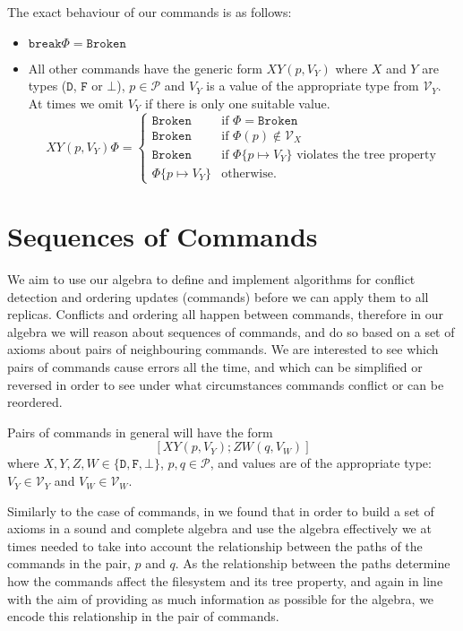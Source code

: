 \documentclass[12pt]{article}
\newcommand{\setvx}[1]{\mathcal{V}_{#1}}
\newcommand{\setp}{\mathcal{P}}
\newcommand{\empt}{\bot}
\newcommand{\fsbroken}{\mathtt{Broken}} %
\newcommand{\FS}{\Phi} %
\newcommand{\cbrk}{\mathtt{break}}
\newcommand{\fscommand}[2]{{#1#2}}
\newcommand{\fsregcommandchar}[1]{\mathtt{#1}}
\newcommand{\cxy}{\fscommand{X}{Y}}
\newcommand{\czw}{\fscommand{Z}{W}}
\theoremstyle{definition}
\begin{document}
The exact behaviour of our commands is as follows:
\begin{itemize}
\item $\cbrk\FS = \fsbroken$
\item
All other commands have the generic form $\cxy(p,V_Y)$ where
$X$ and $Y$ are types ($\fsregcommandchar{D}$, $\fsregcommandchar{F}$ or $\fsregcommandchar{\empt}$),
$p\in\setp$ and $V_Y$ is a value of the appropriate type from $\setvx{Y}$.
At times we omit $V_Y$ if there is only one suitable value.
\[ \cxy(p,V_Y)\FS = 
   \begin{cases}
   \fsbroken &\mbox{if~} \FS=\fsbroken\\
   \fsbroken &\mbox{if~} \FS(p)\not\in\setvx{X}\\
   \fsbroken &\mbox{if~} \FS\{p\mapsto V_Y\} \mbox{~violates the tree property}\\
   \FS\{p\mapsto V_Y\} &\mbox{otherwise.}
   \end{cases}
\]
\end{itemize}

\section{Sequences of Commands}



We aim to use our algebra to define and implement algorithms for conflict detection
and ordering updates (commands) before we can apply them to all replicas.
Conflicts and ordering all happen between commands, therefore in our algebra
we will reason about sequences of commands, 
and do so based on a set of axioms about pairs of neighbouring commands.
We are interested to see which pairs of commands cause errors all the time,
and which can be simplified or reversed
in order to see under what circumstances commands conflict or can be reordered.

Pairs of commands in general will have the form
\[ [\cxy(p,V_Y); \czw(q,V_W)] \]
where $X,Y,Z,W\in\{\fsregcommandchar{D},\fsregcommandchar{F},\empt\}$, $p,q\in\setp$, 
and values are of the appropriate type: 
$V_Y\in\setvx{Y}$ and $V_W\in\setvx{W}$.

Similarly to the case of commands, in \cite{NREC:alg} we found that in order to build
a set of axioms in a sound and complete algebra and use the algebra effectively we at times needed to take into account
the relationship between the paths of the commands in the pair, $p$ and $q$.
As the relationship between the paths determine how the commands affect the filesystem
and its tree property, 
and again in line with the aim of providing as much information as possible for the algebra,
we encode this relationship in the pair of commands.
\end{document}
